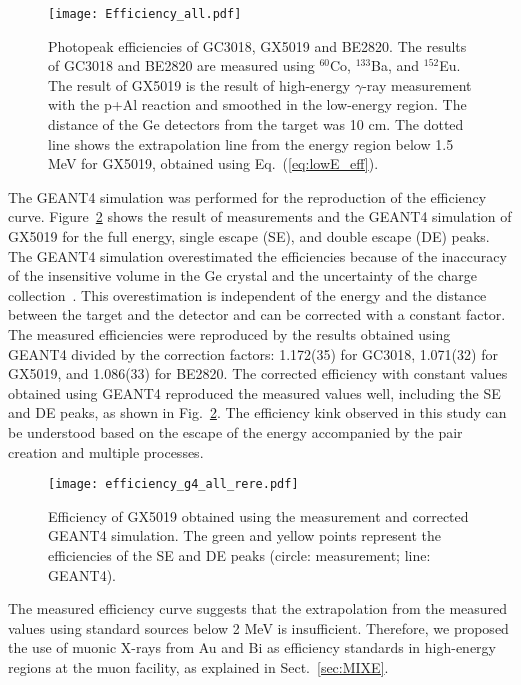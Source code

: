 \begin{figure}
  \centering
  \texttt{[image: Efficiency\_all.pdf]}
  \caption{Photopeak efficiencies of GC3018, GX5019 and BE2820. 
  The results of GC3018 and BE2820 are measured using $^{60}$Co, $^{133}$Ba, and $^{152}$Eu.
  The result of GX5019 is the result of high-energy $\gamma$-ray measurement with the p+Al reaction and smoothed in the low-energy region. The distance of the Ge detectors from the target was 10 cm. The dotted line shows the extrapolation line from the energy region below 1.5 MeV for GX5019, obtained using Eq.~(\ref{eq:lowE_eff}).}
  \label{fig:Efficiency_measure}
\end{figure}

The GEANT4 simulation was performed for the reproduction of the efficiency curve.
Figure~\ref{fig:Efficiency_g4} shows the result of measurements and the GEANT4 simulation of GX5019 for the full energy, single escape (SE), and double escape (DE) peaks. 
The GEANT4 simulation overestimated the efficiencies because of the inaccuracy of the insensitive volume in the Ge crystal and the uncertainty of the charge collection~\cite{Hurtado2004-lz,CebastienJoel2018-tr}. 
This overestimation is independent of the energy and the distance between the target and the detector and can be corrected with a constant factor.
The measured efficiencies were reproduced by the results obtained using GEANT4 divided by the correction factors: 1.172(35) for GC3018, 1.071(32) for GX5019, and 1.086(33) for BE2820.
The corrected efficiency with constant values obtained using GEANT4 reproduced the measured values well, including the SE and DE peaks, as shown in Fig.~\ref{fig:Efficiency_g4}.
The efficiency kink observed in this study can be understood based on the escape of the energy accompanied by the pair creation and multiple processes.


\begin{figure}
  \centering
  \texttt{[image: efficiency\_g4\_all\_rere.pdf]}
  \caption{Efficiency of GX5019 obtained using the measurement and corrected GEANT4 simulation.
  The green and yellow points represent the efficiencies of the SE and DE peaks (circle: measurement; line: GEANT4).}
  \label{fig:Efficiency_g4}
\end{figure}

The measured efficiency curve suggests that the extrapolation from the measured values using standard sources below 2 MeV is insufficient. 
Therefore, we proposed the use of muonic X-rays from Au and Bi as efficiency standards in high-energy regions at the muon facility, as explained in Sect.~\ref{sec:MIXE}.
